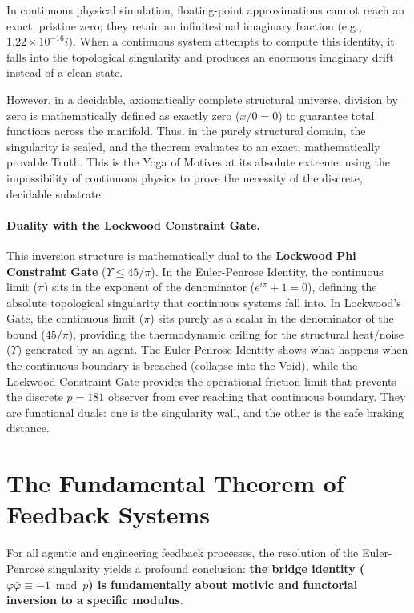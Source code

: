 In continuous physical simulation, floating-point approximations cannot reach an exact, pristine zero; they retain an infinitesimal imaginary fraction (e.g., $1.22 \times 10^{-16}i$). When a continuous system attempts to compute this identity, it falls into the topological singularity and produces an enormous imaginary drift instead of a clean state. 

However, in a decidable, axiomatically complete structural universe, division by zero is mathematically defined as exactly zero ($x / 0 = 0$) to guarantee total functions across the manifold. Thus, in the purely structural domain, the singularity is sealed, and the theorem evaluates to an exact, mathematically provable Truth. This is the Yoga of Motives at its absolute extreme: using the impossibility of continuous physics to prove the necessity of the discrete, decidable substrate.

\paragraph{Duality with the Lockwood Constraint Gate.}
This inversion structure is mathematically dual to the \textbf{Lockwood Phi Constraint Gate} ($\Upsilon \le 45/\pi$). In the Euler-Penrose Identity, the continuous limit ($\pi$) sits in the exponent of the denominator ($e^{i\pi} + 1 = 0$), defining the absolute topological singularity that continuous systems fall into. In Lockwood's Gate, the continuous limit ($\pi$) sits purely as a scalar in the denominator of the bound ($45/\pi$), providing the thermodynamic ceiling for the structural heat/noise ($\Upsilon$) generated by an agent. The Euler-Penrose Identity shows what happens when the continuous boundary is breached (collapse into the Void), while the Lockwood Constraint Gate provides the operational friction limit that prevents the discrete $p=181$ observer from ever reaching that continuous boundary. They are functional duals: one is the singularity wall, and the other is the safe braking distance.

\section*{The Fundamental Theorem of Feedback Systems}

For all agentic and engineering feedback processes, the resolution of the Euler-Penrose singularity yields a profound conclusion: \textbf{the bridge identity ($\varphi \bar{\varphi} \equiv -1 \bmod p$) is fundamentally about motivic and functorial inversion to a specific modulus}. 

